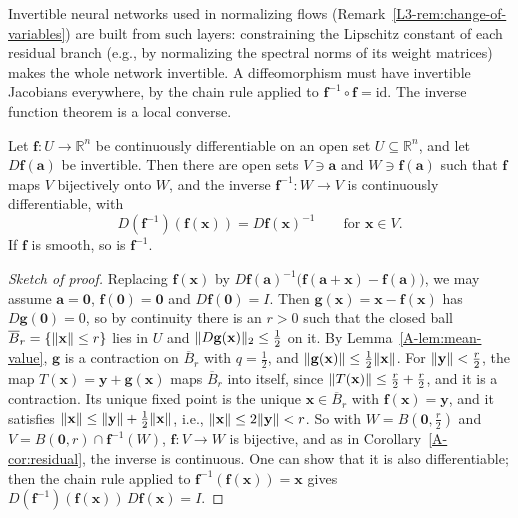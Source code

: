Invertible neural networks used in normalizing flows (Remark~\ref{L3-rem:change-of-variables}) are built from such layers: constraining the Lipschitz constant of each residual branch (e.g., by normalizing the spectral norms of its weight matrices) makes the whole network invertible. A diffeomorphism must have invertible Jacobians everywhere, by the chain rule applied to $\mathbf{f}^{-1} \circ \mathbf{f} = \mathrm{id}$. The inverse function theorem is a local converse.

\begin{theorem}\label{A-thm:inverse-function}
    Let $\mathbf{f}: U \to \mathbb{R}^n$ be continuously differentiable on an open set $U \subseteq \mathbb{R}^n$, and let $D\mathbf{f}(\mathbf{a})$ be invertible. Then there are open sets $V \ni \mathbf{a}$ and $W \ni \mathbf{f}(\mathbf{a})$ such that $\mathbf{f}$ maps $V$ bijectively onto $W$, and the inverse $\mathbf{f}^{-1}: W \to V$ is continuously differentiable, with
    \[D(\mathbf{f}^{-1})(\mathbf{f}(\mathbf{x})) = D\mathbf{f}(\mathbf{x})^{-1} \qquad \text{for } \mathbf{x} \in V.\]
    If $\mathbf{f}$ is smooth, so is $\mathbf{f}^{-1}$.
\end{theorem}

\begin{proof}[Sketch of proof]
    Replacing $\mathbf{f}(\mathbf{x})$ by $D\mathbf{f}(\mathbf{a})^{-1}\big(\mathbf{f}(\mathbf{a} + \mathbf{x}) - \mathbf{f}(\mathbf{a})\big)$, we may assume $\mathbf{a} = \mathbf{0}$, $\mathbf{f}(\mathbf{0}) = \mathbf{0}$ and $D\mathbf{f}(\mathbf{0}) = I$. Then $\mathbf{g}(\mathbf{x}) = \mathbf{x} - \mathbf{f}(\mathbf{x})$ has $D\mathbf{g}(\mathbf{0}) = 0$, so by continuity there is an $r > 0$ such that the closed ball $\overline{B}_r = \{\lVert \mathbf{x} \rVert \leq r\}$ lies in $U$ and $\lVert D\mathbf{g}(\mathbf{x}) \rVert_2 \leq \frac{1}{2}$ on it. By Lemma~\ref{A-lem:mean-value}, $\mathbf{g}$ is a contraction on $\overline{B}_r$ with $q = \frac{1}{2}$, and $\lVert \mathbf{g}(\mathbf{x}) \rVert \leq \frac{1}{2}\lVert \mathbf{x} \rVert$. For $\lVert \mathbf{y} \rVert < \frac{r}{2}$, the map $T(\mathbf{x}) = \mathbf{y} + \mathbf{g}(\mathbf{x})$ maps $\overline{B}_r$ into itself, since $\lVert T(\mathbf{x}) \rVert \leq \frac{r}{2} + \frac{r}{2}$, and it is a contraction. Its unique fixed point is the unique $\mathbf{x} \in \overline{B}_r$ with $\mathbf{f}(\mathbf{x}) = \mathbf{y}$, and it satisfies $\lVert \mathbf{x} \rVert \leq \lVert \mathbf{y} \rVert + \frac{1}{2}\lVert \mathbf{x} \rVert$, i.e., $\lVert \mathbf{x} \rVert \leq 2\lVert \mathbf{y} \rVert < r$. So with $W = B(\mathbf{0}, \frac{r}{2})$ and $V = B(\mathbf{0}, r) \cap \mathbf{f}^{-1}(W)$, $\mathbf{f}: V \to W$ is bijective, and as in Corollary~\ref{A-cor:residual}, the inverse is continuous. One can show that it is also differentiable; then the chain rule applied to $\mathbf{f}^{-1}(\mathbf{f}(\mathbf{x})) = \mathbf{x}$ gives $D(\mathbf{f}^{-1})(\mathbf{f}(\mathbf{x}))\,D\mathbf{f}(\mathbf{x}) = I$.
\end{proof}

